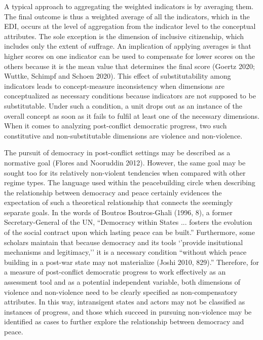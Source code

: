\documentclass [11pt]{article}
\begin{document}
A typical approach to aggregating the weighted indicators is by averaging them. The final outcome is thus a weighted average of all the indicators, which in the EDI, occurs at the level of aggregation from the indicator level to the conceptual attributes. The sole exception is the dimension of inclusive citizenship, which includes only the extent of suffrage. An implication of applying averages is that higher scores on one indicator can be used to compensate for lower scores on the others because it is the mean value that determines the final score (Goertz 2020; Wuttke, Schimpf and Schoen 2020). This effect of substitutability among indicators leads to concept-measure inconsistency when dimensions are conceptualized as necessary conditions because indicators are not supposed to be substitutable. Under such a condition, a unit drops out as an instance of the overall concept as soon as it fails to fulfil at least one of the necessary dimensions. When it comes to analyzing post-conflict democratic progress, two such constitutive and non-substitutable dimensions are violence and non-violence. 

The pursuit of democracy in post-conflict settings may be described as a normative goal (Flores and Nooruddin 2012). However, the same goal may be sought too for its relatively non-violent tendencies when compared with other regime types. The language used within the peacebuilding circle when describing the relationship between democracy and peace certainly evidences the expectation of such a theoretical relationship that connects the seemingly separate goals. In the words of Boutros Boutros-Ghali (1996, 8), a former Secretary-General of the UN, ``Democracy within States ... fosters the evolution of the social contract upon which lasting peace can be built.'' Furthermore, some scholars maintain that because democracy and its tools `'provide insitutional mechanisms and legitimacy,'' it is a necessary condition ``without which peace building in a post-war state may not materialize (Joshi 2010, 829).'' Therefore, for a measure of post-conflict democratic progress to work effectively as an assessment tool and as a potential independent variable, both dimensions of violence and non-violence need to be clearly specified as non-compensatory attributes. In this way, intransigent states and actors may not be classified as instances of progress, and those which succeed in pursuing non-violence may be identified as cases to further explore the relationship between democracy and peace.
\end{document}
